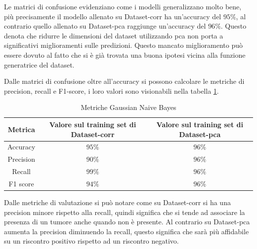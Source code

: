 Le matrici di confusione evidenziano come i modelli generalizzano molto bene, più
precisamente il modello allenato su Dataset-corr ha un'accuracy del $95\%$, al contrario
quello allenato su Dataset-pca raggiunge un'accuracy del $96\%$. Questo denota che 
ridurre le dimensioni del dataset utilizzando pca non porta a significativi miglioramenti
sulle predizioni. Questo mancato miglioramento può essere dovuto al fatto che si
è già trovata una buona ipotesi vicina alla funzione generatrice del dataset.

Dalle matrici di confusione oltre all'accuracy si possono calcolare le metriche
di precision, recall e F1-score, i loro valori sono visionabili nella tabella 
\ref{tab:risultatiBayes}.

\begin{table}[!ht]
    \centering
        
    \begin{tabular}{|c|c|c|}
        \hline
        \textbf{Metrica} & \textbf{Valore sul training set di Dataset-corr} & \textbf{Valore sul training set di Dataset-pca} \\
        \hline
        Accuracy & $95\%$ & $96\%$ \\
        \hline
        Precision & $90\%$ & $96\%$ \\
        \hline
        Recall & $99\%$ & $96\%$ \\
        \hline
        F1 score & $94\%$ & $96\%$ \\
        \hline
    \end{tabular}
    \caption{Metriche Gaussian Naive Bayes}
    \label{tab:risultatiBayes}
\end{table}

Dalle metriche di valutazione si può notare come su Dataset-corr si ha una precision
minore rispetto alla recall, quindi significa che si tende ad associare la presenza
di un tumore anche quando non è presente. Al contrario su Dataset-pca aumenta la
precision diminuendo la recall, questo significa che sarà più affidabile su un 
riscontro positivo rispetto ad un riscontro negativo.